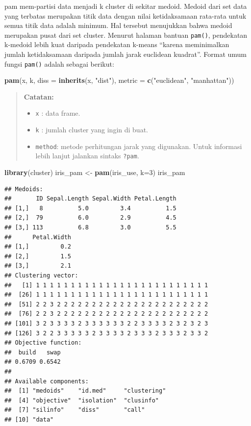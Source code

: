 \documentclass[
]{book}
\newenvironment{Shaded}{\begin{snugshade}}{\end{snugshade}}
\newcommand{\AttributeTok}[1]{\textcolor[rgb]{0.13,0.29,0.53}{#1}}
\newcommand{\DecValTok}[1]{\textcolor[rgb]{0.00,0.00,0.81}{#1}}
\newcommand{\FunctionTok}[1]{\textcolor[rgb]{0.13,0.29,0.53}{\textbf{#1}}}
\newcommand{\NormalTok}[1]{#1}
\newcommand{\OtherTok}[1]{\textcolor[rgb]{0.56,0.35,0.01}{#1}}
\newcommand{\StringTok}[1]{\textcolor[rgb]{0.31,0.60,0.02}{#1}}
\providecommand{\tightlist}{%
  \setlength{\itemsep}{0pt}\setlength{\parskip}{0pt}}
\theoremstyle{definition}
\theoremstyle{definition}
\theoremstyle{definition}
\theoremstyle{definition}
\theoremstyle{remark}
\begin{document}
pam mem-partisi data menjadi k cluster di sekitar medoid. Medoid dari set data yang terbatas merupakan titik data dengan nilai ketidaksamaan rata-rata untuk semua titik data adalah minimum. Hal tersebut menujukkan bahwa medoid merupakan pusat dari set cluster. Menurut halaman bantuan \texttt{pam()}, pendekatan k-medoid lebih kuat daripada pendekatan k-means ``karena meminimalkan jumlah ketidaksamaan daripada jumlah jarak euclidean kuadrat''. Format umum fungsi \texttt{pam()} adalah sebagai berikut:

\begin{Shaded}
\begin{Highlighting}[]
\FunctionTok{pam}\NormalTok{(x, k, }\AttributeTok{diss =} \FunctionTok{inherits}\NormalTok{(x, }\StringTok{"dist"}\NormalTok{),}
    \AttributeTok{metric =} \FunctionTok{c}\NormalTok{(}\StringTok{"euclidean"}\NormalTok{, }\StringTok{"manhattan"}\NormalTok{))}
\end{Highlighting}
\end{Shaded}

\begin{quote}
\textbf{Catatan:}

\begin{itemize}
\tightlist
\item
  \texttt{x} : data frame.
\item
  \texttt{k} : jumlah cluster yang ingin di buat.
\item
  \texttt{method}: metode perhitungan jarak yang digunakan. Untuk informasi lebih lanjut jalankan sintaks \texttt{?pam}.
\end{itemize}
\end{quote}

\begin{Shaded}
\begin{Highlighting}[]
\FunctionTok{library}\NormalTok{(cluster)}
\NormalTok{iris\_pam }\OtherTok{\textless{}{-}} \FunctionTok{pam}\NormalTok{(iris\_use, }\AttributeTok{k=}\DecValTok{3}\NormalTok{)}
\NormalTok{iris\_pam}
\end{Highlighting}
\end{Shaded}

\begin{verbatim}
## Medoids:
##       ID Sepal.Length Sepal.Width Petal.Length
## [1,]   8          5.0         3.4          1.5
## [2,]  79          6.0         2.9          4.5
## [3,] 113          6.8         3.0          5.5
##      Petal.Width
## [1,]         0.2
## [2,]         1.5
## [3,]         2.1
## Clustering vector:
##   [1] 1 1 1 1 1 1 1 1 1 1 1 1 1 1 1 1 1 1 1 1 1 1 1 1 1
##  [26] 1 1 1 1 1 1 1 1 1 1 1 1 1 1 1 1 1 1 1 1 1 1 1 1 1
##  [51] 2 2 3 2 2 2 2 2 2 2 2 2 2 2 2 2 2 2 2 2 2 2 2 2 2
##  [76] 2 2 3 2 2 2 2 2 2 2 2 2 2 2 2 2 2 2 2 2 2 2 2 2 2
## [101] 3 2 3 3 3 3 2 3 3 3 3 3 3 2 2 3 3 3 3 2 3 2 3 2 3
## [126] 3 2 2 3 3 3 3 3 2 3 3 3 3 2 3 3 3 2 3 3 3 2 3 3 2
## Objective function:
##  build   swap 
## 0.6709 0.6542 
## 
## Available components:
##  [1] "medoids"    "id.med"     "clustering"
##  [4] "objective"  "isolation"  "clusinfo"  
##  [7] "silinfo"    "diss"       "call"      
## [10] "data"
\end{verbatim}
\end{document}
